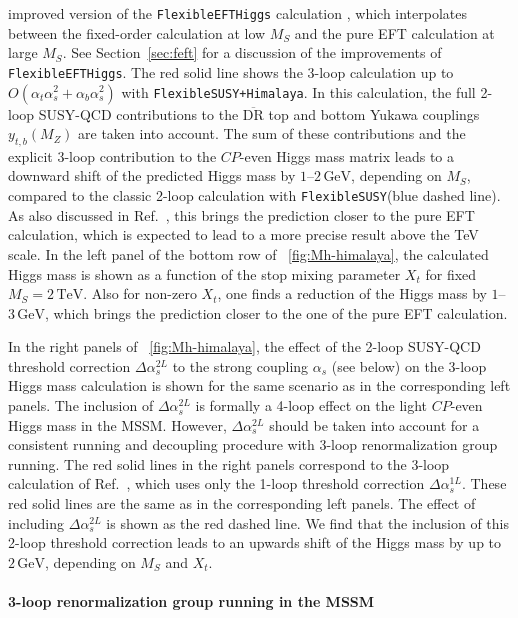 \documentclass[final,3p,11pt,pdflatex]{elsarticle}
\makeatletter
\newcommand{\fs}{\texttt{FlexibleSUSY}\@\xspace}
\newcommand{\Himalaya}{\texttt{Himalaya}\@\xspace}
\newcommand{\fsh}{\texttt{FlexibleSUSY+}\Himalaya\xspace}
\newcommand{\feft}{\texttt{Flex\-ib\-le\-EFT\-Higgs}\@\xspace}
\newcommand{\ol}[1]{\overline{#1}}
\newcommand{\DRbar}{\ensuremath{\ol{\text{DR}}}\xspace}
\newcommand{\unit}[1]{\,\text{#1}}      %
\newcommand{\MS}{\ensuremath{M_S}\xspace}
\newcommand{\figref}[1]{\figurename~\ref{#1}}
\newcommand{\secref}[1]{Section~\ref{#1}}
\newcommand{\CP}{\ensuremath{CP}\xspace}
\newcommand{\SQCD}{SUSY-QCD\xspace}
\def\at{\alpha_t}
\def\ab{\alpha_b}
\def\as{\alpha_s}
\makeatother
\begin{document}
improved version of the \feft calculation \cite{Athron:2016fuq}, which
interpolates
between the fixed-order calculation at low \MS and the pure EFT
calculation at large \MS.  See \secref{sec:feft} for a discussion of
the improvements of \feft.  The red solid line shows the 3-loop
calculation up to $O(\at\as^2 +
\ab\as^2)$ with \fsh \cite{Harlander:2017kuc}.  In this calculation, the
full 2-loop \SQCD contributions to the \DRbar top and bottom Yukawa
couplings $y_{t,b}(M_Z)$ \cite{Bednyakov:2007vm,Bednyakov:2002sf,Bednyakov:2005kt}
are taken into account.  The sum of these contributions
and the explicit 3-loop contribution to the \CP-even
Higgs mass matrix leads to a downward shift of the predicted Higgs
mass by $1$--$2\unit{GeV}$, depending on \MS, compared to the classic 2-loop
calculation with \fs (blue dashed line).  As also discussed in
Ref.~\cite{Harlander:2017kuc}, this brings the prediction closer to the pure
EFT calculation, which is expected to lead to a more precise result above
the TeV scale.  In the left panel of the bottom row of
\figref{fig:Mh-himalaya}, the calculated Higgs mass is shown as a
function of the stop mixing parameter $X_t$ for fixed
$\MS = 2\unit{TeV}$.  Also for non-zero
$X_t$, one finds a reduction of the Higgs mass by
$1$--$3\unit{GeV}$, which brings the prediction closer to the one of
the pure EFT calculation.

In the right panels of \figref{fig:Mh-himalaya}, the effect of the 2-loop
\SQCD threshold correction $\Delta\as^{2L}$
\cite{Harlander:2005wm,Bauer:2008bj,Bednyakov:2010ni} to the strong
coupling $\as$ (see below) on the 3-loop Higgs mass calculation is shown for
the same scenario as in the corresponding left panels.  The inclusion
of $\Delta\as^{2L}$ is formally a 4-loop effect on the light
\CP-even Higgs mass in the MSSM\@.  However, $\Delta\as^{2L}$ should
be taken into account for a consistent running and decoupling
procedure with 3-loop renormalization group running.  The red solid
lines in the right panels correspond to the 3-loop calculation of
Ref.~\cite{Harlander:2017kuc}, which uses only the 1-loop threshold correction
$\Delta\as^{1L}$.  These red solid lines are the same as in the
corresponding left panels.  The effect of including
$\Delta\as^{2L}$ is shown as the red dashed line.  We find that the
inclusion of this 2-loop threshold correction leads to an upwards
shift of the Higgs mass by up to $2\unit{GeV}$, depending on \MS and
$X_t$.

\paragraph{3-loop renormalization group running in the MSSM}
\end{document}
